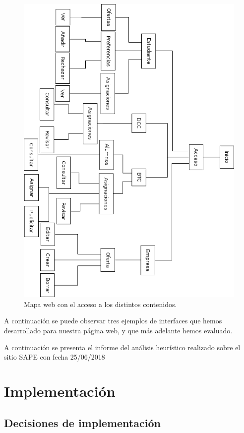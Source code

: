 \documentclass[pdftex,11pt,a4paper]{book}
\begin{document}
\begin{figure}[h]
\begin{center}
\includegraphics[width=\textwidth]{img/arbol_web}
\caption{\label{mapa_web} Mapa web con el acceso a los distintos contenidos.}
\end{center}
\end{figure}

A continuación se puede observar tres ejemplos de interfaces que hemos desarrollado para nuestra página web, y que más adelante hemos evaluado.


A continuación se presenta el informe del análisis heurístico realizado sobre el sitio SAPE con fecha 25/06/2018


\chapter{Implementación}
\section{Decisiones de implementación}
\end{document}
